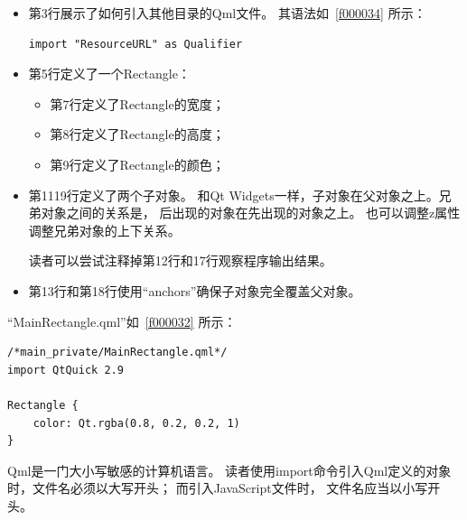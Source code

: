 \begin{itemize}

\item 第3行展示了如何引入其他目录的Qml文件。
其语法如\lstlistingname\ \ref{f000034}
所示：

\FloatBarrier
\begin{lstlisting}[label=f000034,
caption=GoodLuck,
title=\lstlistingname\ \thelstlisting
]
import "ResourceURL" as Qualifier
\end{lstlisting}          %

\item 第5行定义了一个Rectangle：


\begin{itemize}
\item 第7行定义了Rectangle的宽度；
\item 第8行定义了Rectangle的高度；
\item 第9行定义了Rectangle的颜色；
\end{itemize}

\item 第11\raisebox{0.16ex}{\sourcefonttwo\~{}}19行定义了两个子对象。
和Qt Widgets一样，子对象在父对象之上。兄弟对象之间的关系是，
后出现的对象在先出现的对象之上。
也可以调整z属性调整兄弟对象的上下关系。

读者可以尝试注释掉第12行和17行观察程序输出结果。


\item 第13行和第18行使用“anchors”确保子对象完全覆盖父对象。

\end{itemize}

“MainRectangle.qml”如\lstlistingname\ \ref{f000032}
所示：
\FloatBarrier
\begin{lstlisting}[label=f000032,
caption=GoodLuck,
title=\lstlistingname\ \thelstlisting
]
/*main_private/MainRectangle.qml*/
import QtQuick 2.9

Rectangle {
    color: Qt.rgba(0.8, 0.2, 0.2, 1)
}
\end{lstlisting}          %

Qml是一门大小写敏感的计算机语言。
读者使用import命令引入Qml定义的对象时，文件名必须以大写开头；
而引入JavaScript文件时，
文件名应当以小写开头。


